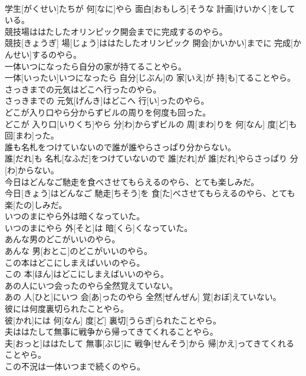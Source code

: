 \documentclass[8pt]{extreport}
\begin{document}
\begin{CJK}{UTF8}{min}
\\	学生[がくせい]たちが 何[なに]やら 面白[おもしろ]そうな 計画[けいかく]をしている。
\\	競技場ははたしたオリンピック開会までに完成するのやら。	
\\	競技[きょうぎ] 場[じょう]ははたしたオリンピック 開会[かいかい]までに 完成[かんせい]するのやら。
\\	一体いつになったら自分の家が持てることやら。	
\\	一体[いったい]いつになったら 自分[じぶん]の 家[いえ]が 持[も]てることやら。
\\	さっきまでの元気はどこへ行ったのやら。	
\\	さっきまでの 元気[げんき]はどこへ 行[い]ったのやら。
\\	どこが入り口やら分からずビルの周りを何度も回った。	
\\	どこが 入り口[いりくち]やら 分[わ]からずビルの 周[まわ]りを 何[なん] 度[ど]も 回[まわ]った。
\\	誰も名札をつけていないので誰が誰やらさっぱり分からない。	
\\	誰[だれ]も 名札[なふだ]をつけていないので 誰[だれ]が 誰[だれ]やらさっぱり 分[わ]からない。
\\	今日はどんなご馳走を食べさせてもらえるのやら、とても楽しみだ。	
\\	今日[きょう]はどんなご 馳走[ちそう]を 食[た]べさせてもらえるのやら、とても 楽[たの]しみだ。
\\	いつのまにやら外は暗くなっていた。	
\\	いつのまにやら 外[そと]は 暗[くら]くなっていた。
\\	あんな男のどこがいいのやら。	
\\	あんな 男[おとこ]のどこがいいのやら。
\\	この本はどこにしまえばいいのやら。	
\\	この 本[ほん]はどこにしまえばいいのやら。
\\	あの人にいつ会ったのやら全然覚えていない。	
\\	あの 人[ひと]にいつ 会[あ]ったのやら 全然[ぜんぜん] 覚[おぼ]えていない。
\\	彼には何度裏切られたことやら。	
\\	彼[かれ]には 何[なん] 度[ど] 裏切[うらぎ]られたことやら。
\\	夫ははたして無事に戦争から帰ってきてくれることやら。	
\\	夫[おっと]ははたして 無事[ぶじ]に 戦争[せんそう]から 帰[かえ]ってきてくれることやら。
\\	この不況は一体いつまで続くのやら。	

\end{CJK}
\end{document}
